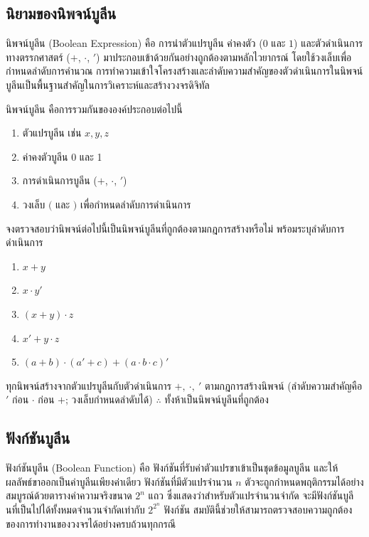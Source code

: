 \subsection{นิยามของนิพจน์บูลีน}
นิพจน์บูลีน (Boolean Expression) คือ การนำตัวแปรบูลีน ค่าคงตัว ($0$ และ $1$) และตัวดำเนินการทางตรรกศาสตร์ ($+$, $\cdot$, $'$) มาประกอบเข้าด้วยกันอย่างถูกต้องตามหลักไวยากรณ์ โดยใช้วงเล็บเพื่อกำหนดลำดับการคำนวณ การทำความเข้าใจโครงสร้างและลำดับความสำคัญของตัวดำเนินการในนิพจน์บูลีนเป็นพื้นฐานสำคัญในการวิเคราะห์และสร้างวงจรดิจิทัล~\parencite{mano2018digital}

\begin{definition}[นิพจน์บูลีน]
นิพจน์บูลีน คือการรวมกันขององค์ประกอบต่อไปนี้
\begin{enumerate}
    \item ตัวแปรบูลีน เช่น $x, y, z$
    \item ค่าคงตัวบูลีน 0 และ 1
    \item การดำเนินการบูลีน ($+$, $\cdot$, $'$)
    \item วงเล็บ $($ และ $)$ เพื่อกำหนดลำดับการดำเนินการ
\end{enumerate}
\end{definition}

\begin{ex}
\label{ex:valid-expressions}
จงตรวจสอบว่านิพจน์ต่อไปนี้เป็นนิพจน์บูลีนที่ถูกต้องตามกฎการสร้างหรือไม่ พร้อมระบุลำดับการดำเนินการ

\begin{enumerate}
    \item $x + y$
    \item $x \cdot y'$
    \item $(x + y) \cdot z$
    \item $x' + y \cdot z$
    \item $(a + b) \cdot (a' + c) + (a \cdot b \cdot c)'$
\end{enumerate}
\end{ex}
\begin{solution}
ทุกนิพจน์สร้างจากตัวแปรบูลีนกับตัวดำเนินการ $+,\ \cdot,\ '$ ตามกฎการสร้างนิพจน์ (ลำดับความสำคัญคือ $'$ ก่อน $\cdot$ ก่อน $+$; วงเล็บกำหนดลำดับได้) $\therefore$ ทั้งห้าเป็นนิพจน์บูลีนที่ถูกต้อง \solhere
\end{solution}

\subsection{ฟังก์ชันบูลีน}
ฟังก์ชันบูลีน (Boolean Function) คือ ฟังก์ชันที่รับค่าตัวแปรขาเข้าเป็นชุดข้อมูลบูลีน และให้ผลลัพธ์ขาออกเป็นค่าบูลีนเพียงค่าเดียว ฟังก์ชันที่มีตัวแปรจำนวน $n$ ตัวจะถูกกำหนดพฤติกรรมได้อย่างสมบูรณ์ด้วยตารางค่าความจริงขนาด $2^n$ แถว ซึ่งแสดงว่าสำหรับตัวแปรจำนวนจำกัด จะมีฟังก์ชันบูลีนที่เป็นไปได้ทั้งหมดจำนวนจำกัดเท่ากับ $2^{2^n}$ ฟังก์ชัน สมบัตินี้ช่วยให้สามารถตรวจสอบความถูกต้องของการทำงานของวงจรได้อย่างครบถ้วนทุกกรณี~\parencite{mano2018digital}

